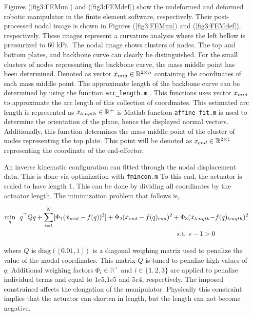 Figures (\ref{fig3:FEMun}) and (\ref{fig3:FEMdef}) show the undeformed and deformed robotic manipulator in the finite element software, respectively. Their post-processed nodal image is shown in  Figures (\ref{fig3:FEMun}) and (\ref{fig3:FEMdef}), respectively. These images represent a curvature analysis where the left bellow is pressurized to 60 kPa. The nodal image shows clusters of nodes. The top and bottom plates, and backbone curve can clearly be distinguished. For the small clusters of nodes representing the backbone curve, the mass middle point has been determined. Denoted as 
vector  $\Bar{x}_{mid} \in \mathbb{R}^{2\times n}$ containing the coordinates of each mass middle point. The approximate length of the backbone curve can be determined by using the function \verb+arc_length.m+ \cite{arclength}. This functions uses vector $\Bar{x}_{mid}$  to approximate the arc length of this collection of coordinates. This estimated arc length is represented as  $\Bar{x}_{length} \in \mathbb{R}^+ $ is Matlab function \verb+affine_fit.m+ \cite{affinefit} is used to determine the orientation of the plane, hence the displayed normal vectors. Additionally, this function determines the mass middle point of the cluster of nodes representing the top plate. This point will be denoted as $\Bar{x}_{end} \in \mathbb{R}^{2\times 1}$representing the coordinate of the end-effector.

An inverse kinematic configuration can fitted through the nodal displacement data. This is done via optimization with \verb+fmincon.m+  To this end, the actuator is scaled to have length 1. This can be done by dividing all coordinates by the actuator length. The minimization problem that follows is,


\begin{equation}
\begin{aligned}
\min_{q} \hspace{5pt}  q^\top Q q  + \sum_{i=1}^{N}[\Phi_1(\Bar{x}_{mid} - f(q))^2] +   \Phi_2(\Bar{x}_{end}  - f(q)_{end})^2 +  \Phi_3(\Bar{x}_{length} - & f(q)_{length})^2  \\ 
\text{s.t.} \hspace{5pt} \epsilon - 1 > 0
\end{aligned}
\end{equation}


where $Q$ is $\text{diag}([0.01,1])$ is a diagonal weighing matrix used to penalize the value of the modal coordinates. This matrix $Q$ is tuned to penalize high values of $q$.  Additional weighing factors $\Phi_i \in \mathbb{R}^+$ and $i \in \{1,2,3\}$ are applied to penalize individual terms and equal to $1e5$,$1e5$ and $5e4$, respectively. The imposed constrained affects the elongation of the manipulator. Physically this constraint implies that the actuator can shorten in length, but the length can not become negative.

